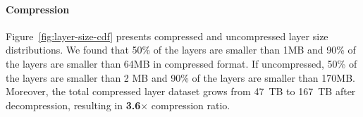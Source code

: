 %
%


%

\paragraph{Compression}
%
Figure~\ref{fig:layer-size-cdf} presents compressed and uncompressed layer size
distributions.
%
We found that 50\% of the layers are smaller than 1MB and 90\% of the layers are
smaller than 64MB in compressed format.
%
If uncompressed, 50\% of the layers are smaller than 2 MB and 90\% of the
layers are smaller than 170MB.
%
Moreover, the total compressed layer dataset grows from 47~TB to 167~TB after decompression, resulting in \textbf{3.6$\times$} compression ratio.

